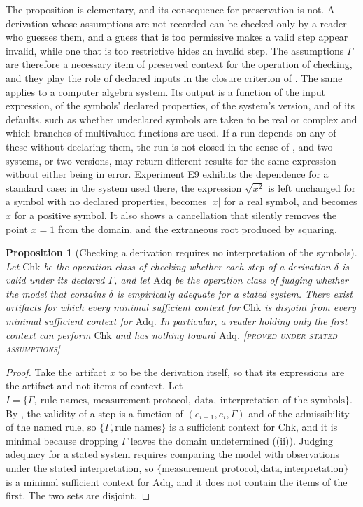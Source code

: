 \documentclass[11pt,twoside,openright]{book}
\theoremstyle{plain}
\newtheorem{proposition}[theorem]{Proposition}
\theoremstyle{definition}
\theoremstyle{remark}
\newcommand{\Proved}{\textup{\textsc{[proved under stated assumptions]}}}
\begin{document}
The proposition is elementary, and its consequence for preservation is not. A derivation whose assumptions are not recorded can be checked only by a reader who guesses them, and a guess that is too permissive makes a valid step appear invalid, while one that is too restrictive hides an invalid step. The assumptions $\Gamma$ are therefore a necessary item of preserved context for the operation of checking, and they play the role of declared inputs in the closure criterion of . The same applies to a computer algebra system. Its output is a function of the input expression, of the symbols' declared properties, of the system's version, and of its defaults, such as whether undeclared symbols are taken to be real or complex and which branches of multivalued functions are used. If a run depends on any of these without declaring them, the run is not closed in the sense of , and two systems, or two versions, may return different results for the same expression without either being in error. Experiment E9 exhibits the dependence for a standard case: in the system used there, the expression $\sqrt{x^2}$ is left unchanged for a symbol with no declared properties, becomes $|x|$ for a real symbol, and becomes $x$ for a positive symbol. It also shows a cancellation that silently removes the point $x=1$ from the domain, and the extraneous root produced by squaring.

\begin{proposition}[Checking a derivation requires no interpretation of the symbols]\label{prop:auditcontext}
Let $\mathrm{Chk}$ be the operation class of checking whether each step of a derivation $\delta$ is valid under its declared $\Gamma$, and let $\mathrm{Adq}$ be the operation class of judging whether the model that contains $\delta$ is empirically adequate for a stated system. There exist artifacts for which every minimal sufficient context for $\mathrm{Chk}$ is disjoint from every minimal sufficient context for $\mathrm{Adq}$. In particular, a reader holding only the first context can perform $\mathrm{Chk}$ and has nothing toward $\mathrm{Adq}$.
\Proved{}
\end{proposition}

\begin{proof}
Take the artifact $x$ to be the derivation itself, so that its expressions are the artifact and not items of context. Let $I=\{\Gamma,\ \text{rule names},\ \text{measurement protocol},\ \text{data},\ \text{interpretation of the symbols}\}$. By , the validity of a step is a function of $(e_{i-1},e_i,\Gamma)$ and of the admissibility of the named rule, so $\{\Gamma,\text{rule names}\}$ is a sufficient context for $\mathrm{Chk}$, and it is minimal because dropping $\Gamma$ leaves the domain undetermined ((ii)). Judging adequacy for a stated system requires comparing the model with observations under the stated interpretation, so $\{\text{measurement protocol},\text{data},\text{interpretation}\}$ is a minimal sufficient context for $\mathrm{Adq}$, and it does not contain the items of the first. The two sets are disjoint.
\end{proof}
\end{document}
